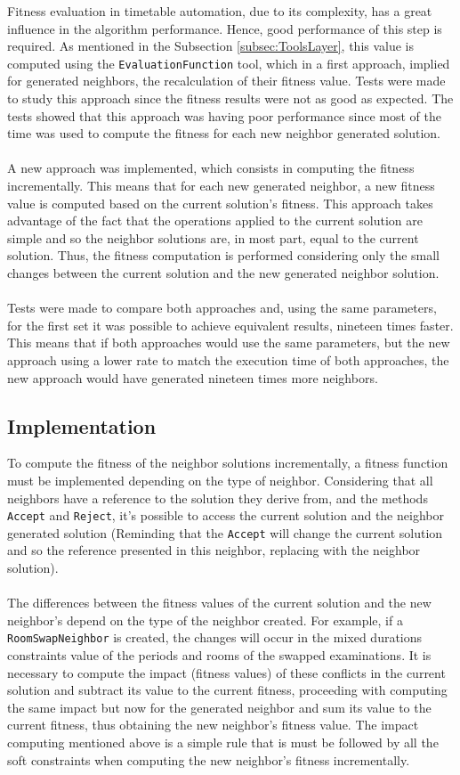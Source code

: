 Fitness evaluation in timetable automation, due to its complexity, has a great influence in the algorithm performance. Hence, good performance of this step is required. As mentioned in the Subsection \ref{subsec:ToolsLayer}, this value is computed using the \verb+EvaluationFunction+ tool, which in a first approach, implied for generated neighbors, the recalculation of their fitness value. Tests were made to study this approach since the fitness results were not as good as expected. The tests showed that this approach was having poor performance since most of the time was used to compute the fitness for each new neighbor generated solution.\\
\\
A new approach was implemented, which consists in computing the fitness incrementally. This means that for each new generated neighbor, a new fitness value is computed based on the current solution's fitness. This approach takes advantage of the fact that the operations applied to the current solution are simple and so the neighbor solutions are, in most part, equal to the current solution. Thus, the fitness computation is performed considering only the small changes between the current solution and the new generated neighbor solution.\\
\\
Tests were made to compare both approaches and, using the same parameters, for the first set it was possible to achieve equivalent results, nineteen times faster. This means that if both approaches would use the same parameters, but the new approach using a lower rate to match the execution time of both approaches, the new approach would have generated nineteen times more neighbors.

\subsection{Implementation}

To compute the fitness of the neighbor solutions incrementally, a fitness function must be implemented depending on the type of neighbor. Considering that all neighbors have a reference to the solution they derive from, and the methods \verb+Accept+ and \verb+Reject+, it's possible to access the current solution and the neighbor generated solution (Reminding that the \verb+Accept+ will change the current solution and so the reference presented in this neighbor, replacing with the neighbor solution). \\
\\
The differences between the fitness values of the current solution and the new neighbor's depend on the type of the neighbor created. For example, if a \verb+RoomSwapNeighbor+ is created, the changes will occur in the mixed durations constraints value of the periods and rooms of the swapped examinations. It is necessary to compute the impact (fitness values) of these conflicts in the current solution and subtract its value to the current fitness, proceeding with computing the same impact but now for the generated neighbor and sum its value to the current fitness, thus obtaining the new neighbor's fitness value. The impact computing mentioned above is a simple rule that is must be followed by all the soft constraints when computing the new neighbor's fitness incrementally.